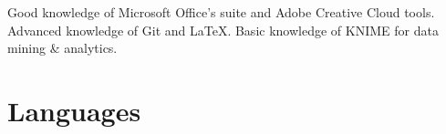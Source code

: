 \documentclass[10pt,a4paper,sans]{moderncv}        %
\begin{document}
 {Good knowledge of Microsoft Office's suite and Adobe Creative Cloud tools. Advanced knowledge of Git and \LaTeX. Basic knowledge of KNIME for data mining \& analytics.}

\section{Languages}

\nocite{*}



\clearpage

\end{document}
